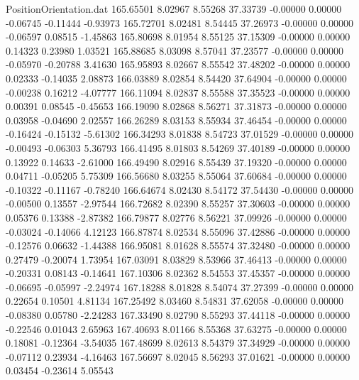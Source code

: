 \begin{filecontents}{PositionOrientation.dat}
 165.65501    8.02967    8.55268    37.33739   -0.00000    0.00000   -0.06745   -0.11444   -0.93973
 165.72701    8.02481    8.54445    37.26973   -0.00000    0.00000   -0.06597    0.08515   -1.45863
 165.80698    8.01954    8.55125    37.15309   -0.00000    0.00000    0.14323    0.23980    1.03521
 165.88685    8.03098    8.57041    37.23577   -0.00000    0.00000   -0.05970   -0.20788    3.41630
 165.95893    8.02667    8.55542    37.48202   -0.00000    0.00000    0.02333   -0.14035    2.08873
 166.03889    8.02854    8.54420    37.64904   -0.00000    0.00000   -0.00238    0.16212   -4.07777
 166.11094    8.02837    8.55588    37.35523   -0.00000    0.00000    0.00391    0.08545   -0.45653
 166.19090    8.02868    8.56271    37.31873   -0.00000    0.00000    0.03958   -0.04690    2.02557
 166.26289    8.03153    8.55934    37.46454   -0.00000    0.00000   -0.16424   -0.15132   -5.61302
 166.34293    8.01838    8.54723    37.01529   -0.00000    0.00000   -0.00493   -0.06303    5.36793
 166.41495    8.01803    8.54269    37.40189   -0.00000    0.00000    0.13922    0.14633   -2.61000
 166.49490    8.02916    8.55439    37.19320   -0.00000    0.00000    0.04711   -0.05205    5.75309
 166.56680    8.03255    8.55064    37.60684   -0.00000    0.00000   -0.10322   -0.11167   -0.78240
 166.64674    8.02430    8.54172    37.54430   -0.00000    0.00000   -0.00500    0.13557   -2.97544
 166.72682    8.02390    8.55257    37.30603   -0.00000    0.00000    0.05376    0.13388   -2.87382
 166.79877    8.02776    8.56221    37.09926   -0.00000    0.00000   -0.03024   -0.14066    4.12123
 166.87874    8.02534    8.55096    37.42886   -0.00000    0.00000   -0.12576    0.06632   -1.44388
 166.95081    8.01628    8.55574    37.32480   -0.00000    0.00000    0.27479   -0.20074    1.73954
 167.03091    8.03829    8.53966    37.46413   -0.00000    0.00000   -0.20331    0.08143   -0.14641
 167.10306    8.02362    8.54553    37.45357   -0.00000    0.00000   -0.06695   -0.05997   -2.24974
 167.18288    8.01828    8.54074    37.27399   -0.00000    0.00000    0.22654    0.10501    4.81134
 167.25492    8.03460    8.54831    37.62058   -0.00000    0.00000   -0.08380    0.05780   -2.24283
 167.33490    8.02790    8.55293    37.44118   -0.00000    0.00000   -0.22546    0.01043    2.65963
 167.40693    8.01166    8.55368    37.63275   -0.00000    0.00000    0.18081   -0.12364   -3.54035
 167.48699    8.02613    8.54379    37.34929   -0.00000    0.00000   -0.07112    0.23934   -4.16463
 167.56697    8.02045    8.56293    37.01621   -0.00000    0.00000    0.03454   -0.23614    5.05543

\end{filecontents}
